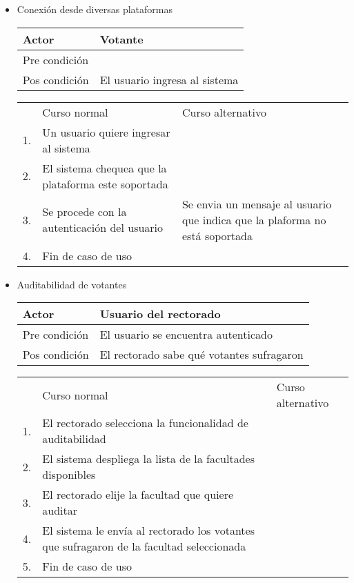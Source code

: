 \begin{itemize}
\bigskip
\item Conexi\'on desde diversas plataformas
\begin{center}
\begin{tabular}{ll}
Actor & Votante \\
\hline
Pre condición &  \\
\hline
Pos condición & El usuario ingresa al sistema \\
\hline
\end{tabular}
\medskip
\begin{tabular}{c p{4cm}|p{4cm}}
 & Curso normal & Curso alternativo \\
 1. & Un usuario quiere ingresar al sistema &   \\
 2. & El sistema chequea que la plataforma este soportada &   \\
 3. & Se procede con la autenticaci\'on del usuario & Se envia un mensaje al usuario que indica que la plaforma no est\'a soportada\\
 4. & Fin de caso de uso & \\
\end{tabular}
\end{center}

\bigskip
\item Auditabilidad de votantes
\begin{center}
\begin{tabular}{ll}
Actor & Usuario del rectorado \\
\hline
Pre condición & El usuario se encuentra autenticado\\
\hline
Pos condición & El rectorado sabe qu\'e votantes sufragaron \\
\hline
\end{tabular}
\medskip
\begin{tabular}{c p{4cm}|p{4cm}}
 & Curso normal & Curso alternativo \\
 1. & El rectorado selecciona la funcionalidad de auditabilidad &   \\
 2. & El sistema despliega la lista de la facultades disponibles &   \\
 3. & El rectorado elije la facultad que quiere auditar & \\
 4. & El sistema le env\'ia al rectorado los votantes que sufragaron de la facultad seleccionada \\
 5. & Fin de caso de uso & \\
\end{tabular}
\end{center}  



\end{itemize}